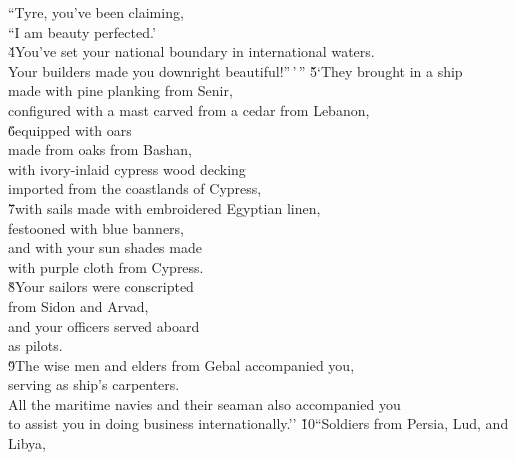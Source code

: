 \begin{poetry}
\poeml ``Tyre, you've been claiming, \\
\poemll    ``I am beauty perfected.' \\
\poeml \v{4}You've set your national boundary in international waters. \\
\poemll    Your builders made you downright beautiful!''\,'\,''
\poeml \v{5}`They brought in a ship \\
\poemll    made with pine planking from Senir, \\
\poeml configured with a mast carved from a cedar from Lebanon, \\
\poeml \v{6}equipped with oars \\
\poemll    made from oaks from Bashan, \\
\poeml with ivory-inlaid cypress wood decking \\
\poemll    imported from the coastlands of Cypress, \\
\poeml \v{7}with sails made with embroidered Egyptian linen, \\
\poemll    festooned with blue banners, \\
\poeml and with your sun shades made \\
\poemll    with purple cloth from Cypress. \\
\poeml \v{8}Your sailors were conscripted \\
\poemll    from Sidon and Arvad, \\
\poeml and your officers served aboard \\
\poemll    as pilots. \\
\poeml \v{9}The wise men and elders from Gebal accompanied you, \\
\poemll    serving as ship's carpenters. \\
\poeml All the maritime navies and their seaman also accompanied you \\
\poemll    to assist you in doing business internationally.''
\poeml \v{10}``Soldiers from Persia, Lud, and Libya, \\

\end{poetry}
